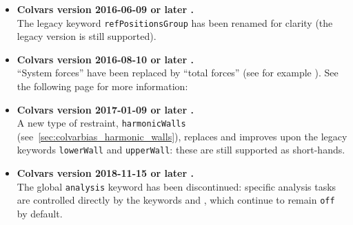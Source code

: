 \begin{itemize}

\item \textbf{Colvars version 2016-06-09 or later .}\\
  The legacy keyword \texttt{refPositionsGroup} has been renamed  for clarity (the legacy version is still supported).

\item \textbf{Colvars version 2016-08-10 or later .}\\
  ``System forces'' have been replaced by ``total forces'' (see for example ).
  See the following page for more information:\\

\item \textbf{Colvars version 2017-01-09 or later .}\\
  A new type of restraint, \texttt{harmonicWalls} (see~\ref{sec:colvarbias_harmonic_walls}), replaces and improves upon the legacy keywords \texttt{lowerWall} and \texttt{upperWall}: these are still supported as short-hands.

\item \textbf{Colvars version 2018-11-15 or later .}\\
  The global \texttt{analysis} keyword has been discontinued: specific analysis tasks are controlled directly by the keywords  and , which continue to remain \texttt{off} by default.


\end{itemize}
